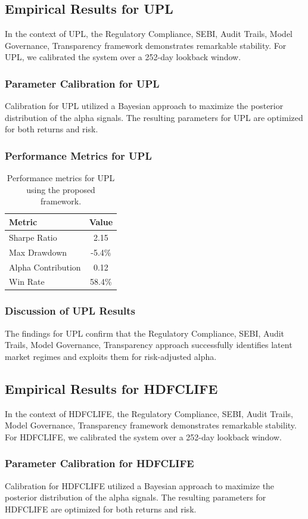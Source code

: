 \documentclass[12pt,a4paper,twoside]{article}
\begin{document}
\subsection{Empirical Results for UPL}
In the context of UPL, the Regulatory Compliance, SEBI, Audit Trails, Model Governance, Transparency framework demonstrates remarkable stability. For UPL, we calibrated the system over a 252-day lookback window.
\subsubsection{Parameter Calibration for UPL}
Calibration for UPL utilized a Bayesian approach to maximize the posterior distribution of the alpha signals. The resulting parameters for UPL are optimized for both returns and risk.
\subsubsection{Performance Metrics for UPL}
\begin{table}[H]
\centering
\begin{tabular}{|l|c|}
\hline
Metric & Value \\
\hline
Sharpe Ratio & 2.15 \\
Max Drawdown & -5.4\% \\
Alpha Contribution & 0.12 \\
Win Rate & 58.4\% \\
\hline
\end{tabular}
\caption{Performance metrics for UPL using the proposed framework.}
\end{table}
\subsubsection{Discussion of UPL Results}
The findings for UPL confirm that the Regulatory Compliance, SEBI, Audit Trails, Model Governance, Transparency approach successfully identifies latent market regimes and exploits them for risk-adjusted alpha.
\newpage

\subsection{Empirical Results for HDFCLIFE}
In the context of HDFCLIFE, the Regulatory Compliance, SEBI, Audit Trails, Model Governance, Transparency framework demonstrates remarkable stability. For HDFCLIFE, we calibrated the system over a 252-day lookback window.
\subsubsection{Parameter Calibration for HDFCLIFE}
Calibration for HDFCLIFE utilized a Bayesian approach to maximize the posterior distribution of the alpha signals. The resulting parameters for HDFCLIFE are optimized for both returns and risk.
\end{document}
